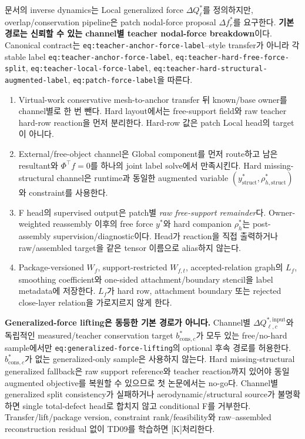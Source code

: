 \documentclass[10pt,a4paper]{article}
\newcommand{\killmark}{\textcolor{KillRed}{[K]}}
\newcommand{\code}[1]{\texttt{#1}}
\begin{document}
\begin{tcolorbox}[colback=LightRed,colframe=BlockRed,title=조건부 F 전에 반드시 고정할 generalized-to-nodal 계약,fonttitle=\bfseries]
문서의 inverse dynamics는 Local generalized force \(\Delta Q_\ell^*\)를 정의하지만,
overlap/conservation pipeline은 patch nodal-force proposal \(\Delta f_r^*\)를 요구한다.
\textbf{기본 경로는 신뢰할 수 있는 channel별 teacher nodal-force breakdown}이다.
Canonical contract는 \code{eq:teacher-anchor-force-label}--style transfer가 아니라
각 stable label
\code{eq:teacher-anchor-force-label}, \code{eq:teacher-hard-free-force-split},
\code{eq:teacher-local-force-label},
\code{eq:teacher-hard-structural-augmented-label},
\code{eq:patch-force-label}을 따른다.
\begin{enumerate}
  \item Virtual-work conservative mesh-to-anchor transfer 뒤 known/base owner를 channel별로 한 번 뺀다.
  Hard layout에서는 free-support field와 raw teacher hard-row reaction을 먼저 분리한다.
  Hard-row 값은 patch Local head의 target이 아니다.
  \item External/free-object channel은 Global component를 먼저 route하고 남은 resultant와
  \(\Phi^\top f=0\)를 하나의 joint label solve에서 만족시킨다.
  Hard missing-structural channel은 runtime과 동일한 augmented variable
  \((y_{\mathrm{struct}}^*,\rho_{h,\mathrm{struct}}^*)\)와 constraint를 사용한다.
  \item F head의 supervised output은 patch별 \emph{raw free-support remainder}다.
  Owner-weighted reassembly 이후의 free force \(y^*\)와 hard companion \(\rho_h^*\)는
  post-assembly supervision/diagnostic이다. Head가 reaction을 직접 출력하거나
  raw/assembled target을 같은 tensor 이름으로 alias하지 않는다.
  \item Package-versioned \(W_f\), support-restricted \(W_{f,t}\), accepted-relation graph의 \(L_f\),
  smoothing coefficient와 one-sided attachment/boundary stencil을 label metadata에 저장한다.
  \(L_f\)가 hard row, attachment boundary 또는 rejected close-layer relation을 가로지르지 않게 한다.
\end{enumerate}

\textbf{Generalized-force lifting은 동등한 기본 경로가 아니다.}
Channel별 \(\Delta Q_{\ell,c}^{*,\mathrm{input}}\)와 독립적인 measured/teacher
conservation target \(b_{\mathrm{cons},c}^*\)가 모두 있는 free/no-hard sample에서만
\code{eq:generalized-force-lifting}의 optional 후속 경로를 허용한다.
\(b_{\mathrm{cons},c}^*\)가 없는 generalized-only sample은 사용하지 않는다.
Hard missing-structural generalized fallback은 raw support reference와 teacher reaction까지 있어야
동일 augmented objective를 복원할 수 있으므로 첫 논문에서는 no-go다.
Channel별 generalized split consistency가 실패하거나 aerodynamic/structural source가 불명확하면
single total-defect head로 합치지 않고 conditional F를 거부한다.
Transfer/lift/package version, constraint rank/feasibility와 raw--assembled reconstruction residual 없이
TD09를 학습하면 \killmark 처리한다.
\end{tcolorbox}
\end{document}
